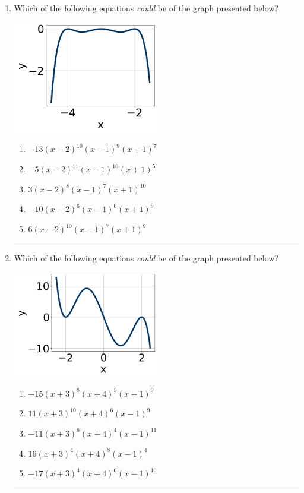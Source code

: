 \documentclass[14pt]{extbook}
\newcommand{\litem}[1]{\item#1\hspace*{-1cm}\rule{\textwidth}{0.4pt}}
\begin{document}
\begin{enumerate}
{\begin{enumerate}[label=\Alph*.]
\end{enumerate} }
\litem{
Which of the following equations \textit{could} be of the graph presented below?
\begin{center}
    \includegraphics[width=0.5\textwidth]{../Figures/polyGraphToFunctionCopyC.png}
\end{center}
\begin{enumerate}[label=\Alph*.]
\item \( -13(x - 2)^{10} (x - 1)^{9} (x + 1)^{7} \)
\item \( -5(x - 2)^{11} (x - 1)^{10} (x + 1)^{5} \)
\item \( 3(x - 2)^{8} (x - 1)^{7} (x + 1)^{10} \)
\item \( -10(x - 2)^{6} (x - 1)^{6} (x + 1)^{9} \)
\item \( 6(x - 2)^{10} (x - 1)^{7} (x + 1)^{9} \)

\end{enumerate} }
\litem{
Which of the following equations \textit{could} be of the graph presented below?
\begin{center}
    \includegraphics[width=0.5\textwidth]{../Figures/polyGraphToFunctionC.png}
\end{center}
\begin{enumerate}[label=\Alph*.]
\item \( -15(x + 3)^{8} (x + 4)^{5} (x - 1)^{9} \)
\item \( 11(x + 3)^{10} (x + 4)^{6} (x - 1)^{9} \)
\item \( -11(x + 3)^{6} (x + 4)^{4} (x - 1)^{11} \)
\item \( 16(x + 3)^{4} (x + 4)^{8} (x - 1)^{4} \)
\item \( -17(x + 3)^{4} (x + 4)^{6} (x - 1)^{10} \)


\end{enumerate}}
\end{enumerate}
\end{document}
